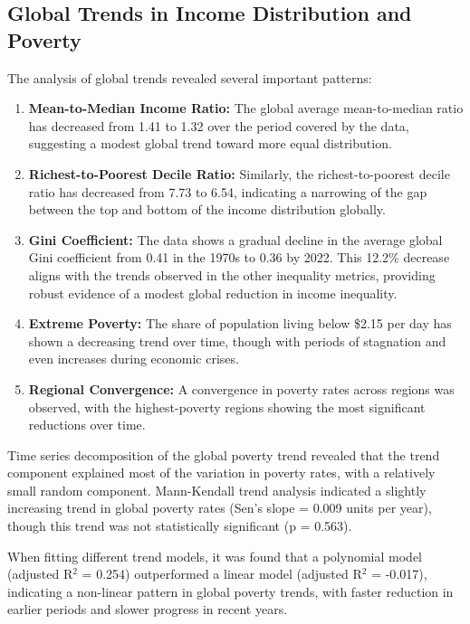 \documentclass[12pt,a4paper]{article}
\begin{document}
\subsection{Global Trends in Income Distribution and Poverty}
The analysis of global trends revealed several important patterns:
\begin{enumerate}
    \item \textbf{Mean-to-Median Income Ratio:} The global average mean-to-median ratio has decreased from 1.41 to 1.32 over the period covered by the data, suggesting a modest global trend toward more equal distribution.
    \item \textbf{Richest-to-Poorest Decile Ratio:} Similarly, the richest-to-poorest decile ratio has decreased from 7.73 to 6.54, indicating a narrowing of the gap between the top and bottom of the income distribution globally.
    \item \textbf{Gini Coefficient:} The data shows a gradual decline in the average global Gini coefficient from 0.41 in the 1970s to 0.36 by 2022. This 12.2\% decrease aligns with the trends observed in the other inequality metrics, providing robust evidence of a modest global reduction in income inequality.
    \item \textbf{Extreme Poverty:} The share of population living below \$2.15 per day has shown a decreasing trend over time, though with periods of stagnation and even increases during economic crises.
    \item \textbf{Regional Convergence:} A convergence in poverty rates across regions was observed, with the highest-poverty regions showing the most significant reductions over time.
\end{enumerate}

Time series decomposition of the global poverty trend revealed that the trend component explained most of the variation in poverty rates, with a relatively small random component. Mann-Kendall trend analysis indicated a slightly increasing trend in global poverty rates (Sen's slope = 0.009 units per year), though this trend was not statistically significant (p = 0.563).

When fitting different trend models, it was found that a polynomial model (adjusted R$^2$ = 0.254) outperformed a linear model (adjusted R$^2$ = -0.017), indicating a non-linear pattern in global poverty trends, with faster reduction in earlier periods and slower progress in recent years.
\end{document}
